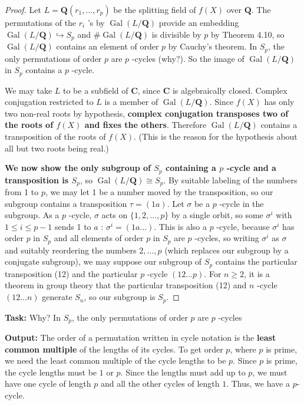 \begin{proof}
Let $L=\mathbf{Q}\left(r_1, \ldots, r_p\right)$ be the splitting field of $f(X)$ over $\mathbf{Q}$. The permutations of the $r_i$ 's by $\operatorname{Gal}(L / \mathbf{Q})$ provide an embedding $\operatorname{Gal}(L / \mathbf{Q}) \hookrightarrow S_p$ and $\# \operatorname{Gal}(L / \mathbf{Q})$ is divisible by $p$ by Theorem 4.10, so $\operatorname{Gal}(L / \mathbf{Q})$ contains an element of order $p$ by Cauchy's theorem. In $S_p$, the only permutations of order $p$ are $p$ -cycles (why?). So the image of $\operatorname{Gal}(L / \mathbf{Q})$ in $S_p$ contains a $p$ -cycle.

We may take $L$ to be a subfield of $\mathbf{C}$, since $\mathbf{C}$ is algebraically closed. Complex conjugation restricted to $L$ is a member of $\operatorname{Gal}(L / \mathbf{Q})$. Since $f(X)$ has only two non-real roots by hypothesis, \textbf{complex conjugation transposes two of the roots of $f(X)$ and fixes the others}. Therefore $\operatorname{Gal}(L / \mathbf{Q})$ contains a transposition of the roots of $f(X)$. (This is the reason for the hypothesis about all but two roots being real.)

\textbf{We now show the only subgroup of $S_p$ containing a $p$ -cycle and a transposition is $S_p$}, so $\operatorname{Gal}(L / \mathbf{Q}) \cong S_p$. By suitable labeling of the numbers from 1 to $p$, we may let 1 be a number moved by the transposition, so our subgroup contains a transposition $\tau=(1 a)$. Let $\sigma$ be a $p$ -cycle in the subgroup. As a $p$ -cycle, $\sigma$ acts on $\{1,2, \ldots, p\}$ by a single orbit, so some $\sigma^i$ with $1 \leq i \leq p-1$ sends 1 to $a$ : $\sigma^i=(1 a \ldots)$. This is also a $p$ -cycle, because $\sigma^i$ has order $p$ in $S_p$ and all elements of order $p$ in $S_p$ are $p$ -cycles, so writing $\sigma^i$ as $\sigma$ and suitably reordering the numbers $2, \ldots, p$ (which replaces our subgroup by a conjugate subgroup), we may suppose our subgroup of $S_p$ contains the particular transposition (12) and the particular $p$ -cycle $(12 \ldots p)$. For $n \geq 2$, it is a theorem in group theory that the particular transposition (12) and $n$ -cycle $(12 \ldots n)$ generate $S_n$, so our subgroup is $S_p$.
\end{proof}

\textbf{Task:} Why? In $S_p$, the only permutations of order $p$ are $p$ -cycles

\textbf{Output:}
The order of a permutation written in cycle notation is the \textbf{least common multiple} of the lengths of its cycles. To get order $p$, where $p$ is prime, we need the least common multiple of the cycle lengths to be $p$. Since $p$ is prime, the cycle lengths must be $1$ or $p$. Since the lengths must add up to $p$, we must have one cycle of length $p$ and all the other cycles of length $1$. Thus, we have a $p$-cycle.

